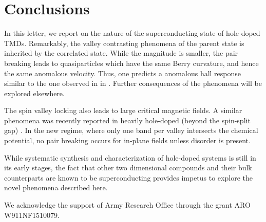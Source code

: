 \section{Conclusions}

In this letter, we report on the nature of the superconducting state
of hole doped TMDs.
Remarkably, the valley contrasting phenomena of the parent state
is inherited by the correlated state.
While the magnitude is smaller, the pair breaking leads to quasiparticles
which have the same Berry curvature, and hence the same anomalous velocity.
Thus, one predicts a anomalous hall response similar to
the one observed in in .
Further consequences of the phenomena will be explored elsewhere.

The spin valley locking also leads to large critical magnetic fields.
A similar phenomena was recently reported in heavily hole-doped
(beyond the spin-split gap) .
In the new regime, where only one band per valley intersects
the chemical potential, no pair breaking occurs
for in-plane fields unless disorder is present.

While systematic synthesis and characterization of hole-doped systems
is still in its early stages, the fact that other two dimensional compounds
and their bulk counterparts are known to be superconducting
provides impetus to explore the novel phenomena described here.

We acknowledge the support of Army Research Office through the grant
ARO W911NF1510079.

